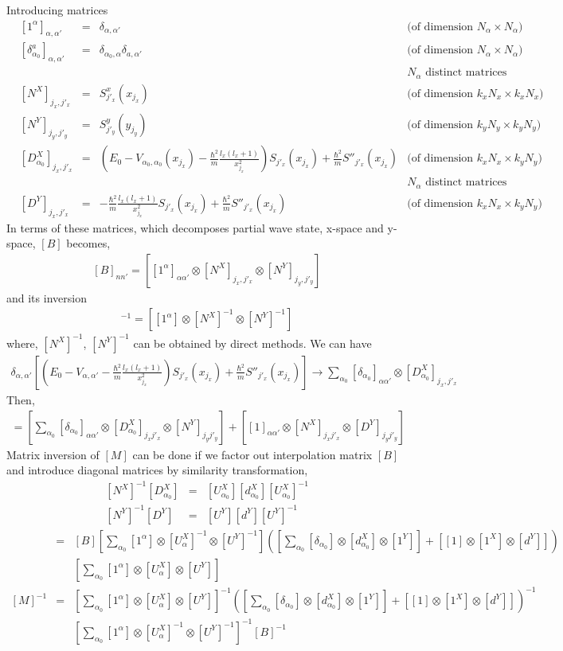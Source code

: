 \documentclass[11pt]{article}
\newcommand{\bea}{\begin{eqnarray}}
\newcommand{\eea}{\end{eqnarray}}
\newcommand{\no}{\nonumber \\}
\begin{document}
Introducing matrices
\begin{align}
&[1^\alpha]_{\alpha,\alpha'} 
&=&\delta_{\alpha,\alpha'} 
&\mbox{(of dimension $N_\alpha\times N_\alpha$)} \no
&[\delta^a_{\alpha_0}]_{\alpha,\alpha'}
&=&\delta_{\alpha_0,\alpha}\delta_{a,\alpha'}
&\mbox{(of dimension $N_\alpha\times N_\alpha$)}\no
& & & &\mbox{$N_\alpha$ distinct matrices} \no
&[N^X]_{j_x,j'_x}
&=& S^x_{j'_x}(x_{j_x})
&\mbox{(of dimension $k_x N_x \times k_x N_x$)}\no
&[N^Y]_{j_y,j'_y}
&=& S^y_{j'_y}(y_{j_y})
&\mbox{(of dimension $k_y N_y \times k_y N_y$)}\no
&[D^X_{\alpha_0}]_{j_x,j'_x}
&=& \left( E_0-V_{\alpha_0,\alpha_0}(x_{j_x})
          -\frac{\hbar^2}{m}\frac{l_x(l_x+1)}{x_{j_x}^2}
          \right) S_{j'_x}(x_{j_x})
          +\frac{\hbar^2}{m}S''_{j'_x}(x_{j_x})
&\mbox{(of dimension $k_x N_x\times k_y N_y$)}\no
& & & &\mbox{$N_\alpha$ distinct matrices} \no 
&[D^Y]_{j_x,j'_x}
&=& -\frac{\hbar^2}{m}\frac{l_x(l_x+1)}{x_{j_x}^2}
          S_{j'_x}(x_{j_x})
          +\frac{\hbar^2}{m}S''_{j'_x}(x_{j_x})
&\mbox{(of dimension $k_x N_x\times k_y N_y$)}
\end{align}
In terms of these matrices, which decomposes
partial wave state, x-space and y-space,
$[B]$ becomes,
\bea
\left[B\right]_{nn'}=[[1^\alpha]_{\alpha\alpha'}\otimes
           [N^X]_{j_x,j'_x}\otimes 
           [N^Y]_{j_y,j'_y}]
\eea
and its inversion
\bea
[B]^{-1}=[[1^\alpha]\otimes[N^X]^{-1}\otimes [N^Y]^{-1}]
\eea
where, $[N^X]^{-1}$, $[N^Y]^{-1}$ can be obtained by
direct methods.
We can have
\bea
\delta_{\alpha,\alpha'}
\left[(E_0-V_{\alpha,\alpha'}
     -\frac{\hbar^2}{m}\frac{l_x(l_x+1)}{x_{j_x}^2}) 
     S_{j'_x}(x_{j_x})
     +\frac{\hbar^2}{m}S''_{j'_x}(x_{j_x})\right]
\to \sum_{\alpha_0}[\delta_{\alpha_0}]_{\alpha\alpha'}
            \otimes [D^X_{\alpha_0}]_{j_x,j'_x}  
\eea
Then,
\bea
[M]=\left[\sum_{\alpha_0}
    [\delta_{\alpha_0}]_{\alpha\alpha'}\otimes
    [D_{\alpha_0}^X]_{j_x j'_x}\otimes [N^Y]_{j_y j'_y}\right]
    +\left[[1]_{\alpha\alpha'}\otimes[N^X]_{j_x j'_x}
     \otimes [D^Y]_{j_y j'_y}\right]
\eea
Matrix inversion of $[M]$ can be done
if we factor out interpolation matrix $[B]$
and introduce diagonal matrices by similarity transformation,
\bea
\left[N^X\right]^{-1}[D^X_{\alpha_0}]
&=&[U^X_{\alpha_0}][d^X_{\alpha_0}][U^X_{\alpha_0}]^{-1}\no
\left[N^Y\right]^{-1}[D^Y]
&=&[U^Y][d^Y][U^Y]^{-1}
\eea
\bea
[M]&=&[B]\left[\sum_{\alpha_0}[1^\alpha]\otimes[U^X_\alpha]^{-1}
             \otimes [U^Y]^{-1}\right]    
    \left(\left[\sum_{\alpha_0}
    [\delta_{\alpha_0}]\otimes
    [d_{\alpha_0}^X]\otimes [1^Y]\right]
    +\left[[1]\otimes[1^X]
     \otimes [d^Y]\right] \right)\no & &
     \left[\sum_{\alpha_0}[1^\alpha]\otimes[U^X_\alpha]
             \otimes [U^Y]\right] \no
\left[M\right]^{-1}&=&\left[\sum_{\alpha_0}[1^\alpha]\otimes[U^X_\alpha]
             \otimes [U^Y]\right]^{-1}
           \left(\left[\sum_{\alpha_0}
    [\delta_{\alpha_0}]\otimes
    [d_{\alpha_0}^X]\otimes [1^Y]\right]
    +\left[[1]\otimes[1^X]
     \otimes [d^Y]\right] \right)^{-1}  \no & &
     \left[\sum_{\alpha_0}[1^\alpha]\otimes[U^X_\alpha]^{-1}
             \otimes [U^Y]^{-1}\right]^{-1}
     [B]^{-1}        
\eea
\end{document}
